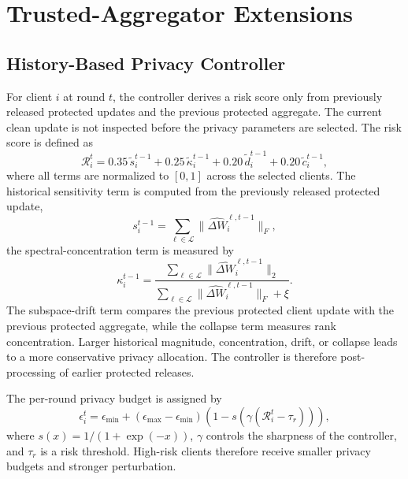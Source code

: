 \documentclass[a4paper,fleqn]{cas-dc}
\begin{document}
\section{Trusted-Aggregator Extensions}
\label{app:extensions}
\subsection{History-Based Privacy Controller}
\label{subsec:controller}
For client $i$ at round $t$, the controller derives a risk score only from
previously released protected updates and the previous protected aggregate.
The current clean update is not inspected before the privacy parameters are
selected. The risk score is defined as
\begin{equation}
\mathcal{R}_i^t =
0.35\,\tilde{s}_i^{t-1}
+0.25\,\tilde{\kappa}_i^{t-1}
+0.20\,\tilde{d}_i^{t-1}
+0.20\,\tilde{c}_i^{t-1},
\end{equation}
where all terms are normalized to $[0,1]$ across the selected clients. The
historical sensitivity term is computed from the previously released
protected update,
\begin{equation}
s_i^{t-1}=\sum_{\ell\in\mathcal{L}}\|\widehat{\Delta W}_i^{\ell,t-1}\|_F,
\end{equation}
the spectral-concentration term is measured by
\begin{equation}
\kappa_i^{t-1}=
\frac{\sum_{\ell\in\mathcal{L}}\|\widehat{\Delta W}_i^{\ell,t-1}\|_2}
{\sum_{\ell\in\mathcal{L}}\|\widehat{\Delta W}_i^{\ell,t-1}\|_F+\xi}.
\end{equation}
The subspace-drift term compares the previous protected client update with
the previous protected aggregate, while the collapse term measures rank
concentration. Larger historical magnitude, concentration, drift, or
collapse leads to a more conservative privacy allocation. The controller is
therefore post-processing of earlier protected releases.
\par
The per-round privacy budget is assigned by
\begin{equation}
\epsilon_i^t =
\epsilon_{\min}
+
(\epsilon_{\max}-\epsilon_{\min})
\left(1-s(\gamma(\mathcal{R}_i^t-\tau_r))\right),
\end{equation}
where $s(x)=1/(1+\exp(-x))$, $\gamma$ controls the sharpness of the
controller, and $\tau_r$ is a risk threshold. High-risk clients therefore
receive smaller privacy budgets and stronger perturbation.
\end{document}
